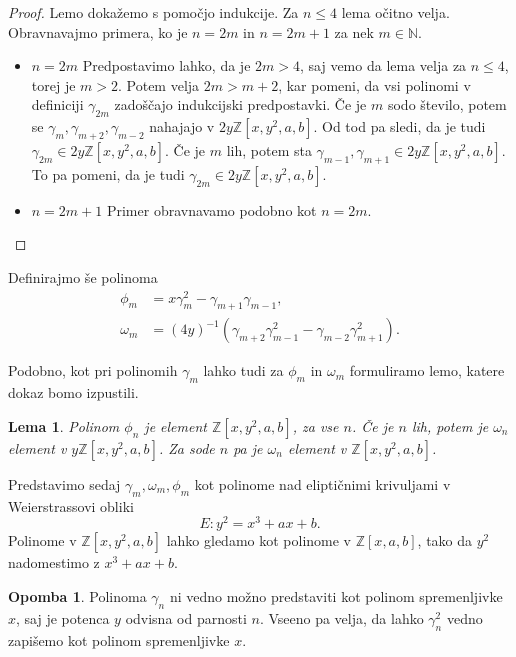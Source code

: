 \documentclass[12pt,a4paper,twoside]{article}
\theoremstyle{definition} %
\newtheorem{opomba}[definicija]{Opomba}
\theoremstyle{plain} %
\newtheorem{lema}[definicija]{Lema}
\numberwithin{equation}{section}  %
\newcommand{\N}{\mathbb N}
\newcommand{\Z}{\mathbb Z}
\begin{document}
\begin{proof}
Lemo dokažemo s pomočjo indukcije. Za $n \leq 4$ lema očitno velja. Obravnavajmo primera, ko je $n=2m$ in  $n=2m+1$ za nek $m\in\N$.
\begin{itemize}
\item{$n=2m$}
Predpostavimo lahko, da je $2m>4$, saj vemo da lema velja za $n\leq 4$, torej je $m>2$. Potem velja $2m>m+2$, kar pomeni, da vsi polinomi v definiciji $\gamma_{2m}$ zadoščajo indukcijski predpostavki. Če je $m$ sodo število, potem se $\gamma_{m},\gamma_{m+2},\gamma_{m-2}$ nahajajo v $2y\Z[x,y^2,a,b]$. Od tod pa sledi, da je tudi $\gamma_{2m} \in 2y\Z[x,y^2,a,b]$.
Če je $m$ lih, potem sta $\gamma_{m-1},\gamma_{m+1} \in 2y\Z[x,y^2,a,b]$. To pa pomeni, da je tudi  $\gamma_{2m} \in 2y\Z[x,y^2,a,b]$.
\item{$n=2m+1$}
Primer obravnavamo podobno kot $n=2m$.


\end{itemize}


\end{proof}

Definirajmo še polinoma
\begin{align}
\phi_m &{}=x\gamma^2_m-\gamma_{m+1}\gamma_{m-1}, \nonumber \\
\omega_m &{} = (4y)^{-1}(\gamma_{m+2}\gamma^2_{m-1}-\gamma_{m-2}\gamma^2_{m+1}). \nonumber
\end{align}

Podobno, kot pri polinomih $\gamma_m$ lahko tudi za $\phi_m$ in $\omega_m$ formuliramo lemo, katere dokaz bomo izpustili.

\begin{lema}
Polinom $\phi_{n}$ je element $\Z[x,y^2,a,b]$, za vse $n$. Če je $n$ lih, potem je $\omega_{n}$ element v \newline $y\Z[x,y^2,a,b]$. Za sode $n$ pa je $\omega_{n}$ element v $\Z[x,y^2,a,b]$.

\end{lema}

Predstavimo sedaj $\gamma_m, \omega_m, \phi_m$ kot polinome nad eliptičnimi krivuljami v Weierstrassovi obliki
$$E: y^2=x^3+ax+b.$$
Polinome v $\Z[x,y^2,a,b]$ lahko gledamo kot polinome v $\Z[x,a,b]$, tako da $y^2$ nadomestimo z $x^3+ax+b$.

\begin{opomba}
Polinoma $\gamma_n$ ni vedno možno predstaviti kot polinom spremenljivke $x$, saj je potenca $y$ odvisna od parnosti $n$. Vseeno pa velja, da lahko $\gamma^2_n$ vedno zapišemo kot polinom spremenljivke $x$.

\end{opomba}
\end{document}
